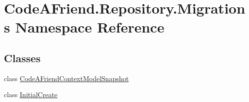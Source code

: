 \hypertarget{namespace_code_a_friend_1_1_repository_1_1_migrations}{}\section{Code\+A\+Friend.\+Repository.\+Migrations Namespace Reference}
\label{namespace_code_a_friend_1_1_repository_1_1_migrations}
\subsection*{Classes}
\begin{DoxyCompactItemize}
\item 
class \mbox{\hyperlink{class_code_a_friend_1_1_repository_1_1_migrations_1_1_code_a_friend_context_model_snapshot}{Code\+A\+Friend\+Context\+Model\+Snapshot}}
\item 
class \mbox{\hyperlink{class_code_a_friend_1_1_repository_1_1_migrations_1_1_initial_create}{Initial\+Create}}
\end{DoxyCompactItemize}
